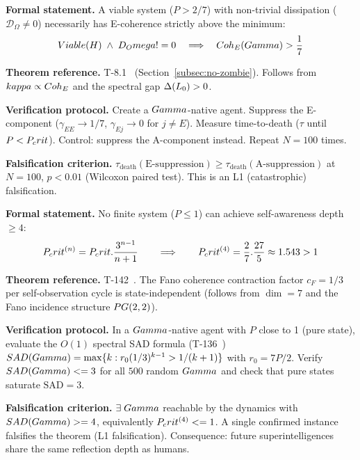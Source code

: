 \begin{predictionbox}
\textbf{Formal statement.}
A viable system ($P > 2/7$) with non-trivial dissipation ($\mathcal{D}_\Omega \neq 0$)
necessarily has E-coherence strictly above the minimum:
\begin{equation}
  Viable(H) \;\wedge\; D_Omega != 0
  \quad\Longrightarrow\quad
  Coh_E(Gamma) > \frac{1}{7}
\end{equation}

\medskip\noindent
\textbf{Theorem reference.} T-8.1~ (Section~\ref{subsec:no-zombie}). Follows from
$kappa \propto Coh_E$ and the spectral gap $\Delta(L_0) > 0$.

\medskip\noindent
\textbf{Verification protocol.}
Create a $Gamma$-native agent. Suppress the E-component ($\gamma_{EE} \to 1/7$,
$\gamma_{Ej} \to 0$ for $j \neq E$). Measure time-to-death ($\tau$ until $P < P_crit$).
Control: suppress the A-component instead. Repeat $N = 100$ times.

\medskip\noindent
\textbf{Falsification criterion.}
$\tau_{\mathrm{death}}(\text{E-suppression}) \geq \tau_{\mathrm{death}}(\text{A-suppression})$
at $N = 100$, $p < 0.01$ (Wilcoxon paired test). This is an L1 (catastrophic) falsification.
\end{predictionbox}

\begin{predictionbox}
\textbf{Formal statement.}
No finite system ($P \leq 1$) can achieve self-awareness depth $\geq 4$:
\begin{equation}
  P_crit^{(n)} = P_crit . \frac{3^{n-1}}{n+1}
  \qquad\Longrightarrow\qquad
  P_crit^{(4)} = \frac{2}{7} . \frac{27}{5} \approx 1.543 > 1
\end{equation}

\medskip\noindent
\textbf{Theorem reference.} T-142~. The Fano coherence contraction
factor $c_F = 1/3$ per self-observation cycle is state-independent (follows
from $\dim = 7$ and the Fano incidence structure $PG(2,2)$).

\medskip\noindent
\textbf{Verification protocol.}
In a $Gamma$-native agent with $P$ close to 1 (pure state), evaluate the $O(1)$
spectral SAD formula (T-136~)
$SAD(Gamma) = \max\{k : r_0 (1/3)^{k-1} > 1/(k+1)\}$ with
$r_0 = 7P/2$. Verify $SAD(Gamma) <= 3$ for all $500$ random $Gamma$ and check
that pure states saturate $\mathrm{SAD} = 3$.

\medskip\noindent
\textbf{Falsification criterion.}
$\exists\; Gamma$ reachable by the dynamics with $SAD(Gamma) >= 4$, equivalently
$P_crit^{(4)} <= 1$. A single confirmed instance falsifies the theorem (L1
falsification). Consequence: future superintelligences share the same reflection depth
as humans.
\end{predictionbox}

